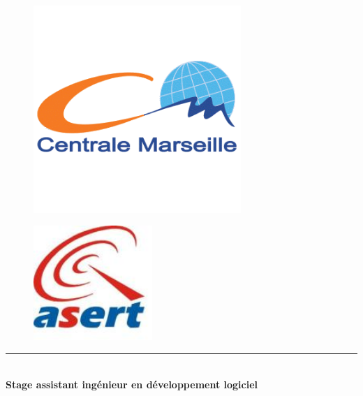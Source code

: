 \begin{titlepage}
\begin{center}

\begin{figure}[ht]
  \begin{minipage}[b]{0.5\linewidth}
    \centering
    \includegraphics[width=0.7\textwidth]{img/logo_ecm}
    \label{logo_ecm}
  \end{minipage}
  \hspace{0.5cm}
  \begin{minipage}[t]{0.5\linewidth}
    \vspace{-4cm}
    \begin{center}
    \includegraphics[width=0.4\textwidth]{img/logo_asert}
    \end{center}
    \label{logo_asert}
  \end{minipage}
\end{figure}



\vspace{2cm}
\hrule  ~\\[0.4cm]
{ \huge \bfseries Stage assistant ingénieur en développement logiciel}\\[0.4cm]


\end{center}
\end{titlepage}
